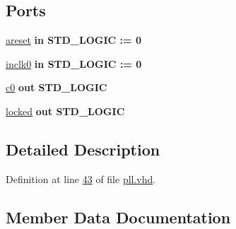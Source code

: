 \subsection*{Ports}
 \begin{DoxyCompactItemize}
\item 
\hyperlink{classpll_a5ff6e3af321d94570fc485fa1bce5a06}{areset}  {\bfseries {\bfseries \textcolor{keywordflow}{in}\textcolor{vhdlchar}{ }}} {\bfseries \textcolor{comment}{S\+T\+D\+\_\+\+L\+O\+G\+I\+C}\textcolor{vhdlchar}{ }\textcolor{vhdlchar}{ }\textcolor{vhdlchar}{\+:}\textcolor{vhdlchar}{=}\textcolor{vhdlchar}{ }\textcolor{vhdlchar}{ }\textcolor{vhdlchar}{\textquotesingle{}}\textcolor{vhdlchar}{ } \textcolor{vhdldigit}{0} \textcolor{vhdlchar}{ }\textcolor{vhdlchar}{\textquotesingle{}}\textcolor{vhdlchar}{ }} 
\item 
\hyperlink{classpll_a9463f4cc62782c2faac516c942dcb5db}{inclk0}  {\bfseries {\bfseries \textcolor{keywordflow}{in}\textcolor{vhdlchar}{ }}} {\bfseries \textcolor{comment}{S\+T\+D\+\_\+\+L\+O\+G\+I\+C}\textcolor{vhdlchar}{ }\textcolor{vhdlchar}{ }\textcolor{vhdlchar}{\+:}\textcolor{vhdlchar}{=}\textcolor{vhdlchar}{ }\textcolor{vhdlchar}{ }\textcolor{vhdlchar}{\textquotesingle{}}\textcolor{vhdlchar}{ } \textcolor{vhdldigit}{0} \textcolor{vhdlchar}{ }\textcolor{vhdlchar}{\textquotesingle{}}\textcolor{vhdlchar}{ }} 
\item 
\hyperlink{classpll_abbf54d96b104435e8cbaadcf0e9184bd}{c0}  {\bfseries {\bfseries \textcolor{keywordflow}{out}\textcolor{vhdlchar}{ }}} {\bfseries \textcolor{comment}{S\+T\+D\+\_\+\+L\+O\+G\+I\+C}\textcolor{vhdlchar}{ }} 
\item 
\hyperlink{classpll_ab33e72e8245db404191648e9a25344eb}{locked}  {\bfseries {\bfseries \textcolor{keywordflow}{out}\textcolor{vhdlchar}{ }}} {\bfseries \textcolor{comment}{S\+T\+D\+\_\+\+L\+O\+G\+I\+C}\textcolor{vhdlchar}{ }} 
\end{DoxyCompactItemize}


\subsection{Detailed Description}


Definition at line \hyperlink{pll_8vhd_source_l00043}{43} of file \hyperlink{pll_8vhd_source}{pll.\+vhd}.



\subsection{Member Data Documentation}
\hypertarget{classpll_a470a86ce8776f637b0483eabf2d92ad2}{}
